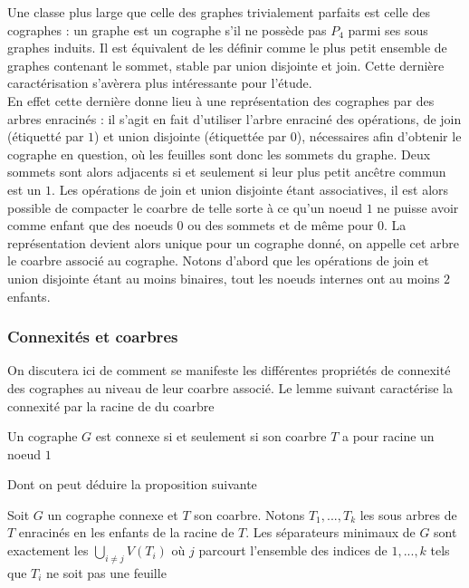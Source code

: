 \documentclass{scrartcl}
\begin{document}
\begin{flushleft}
Une classe plus large que celle des graphes trivialement parfaits est celle des cographes : un graphe est un cographe s'il ne possède pas
$P_4$ parmi ses sous graphes induits. Il est équivalent de les définir comme le plus petit ensemble de graphes contenant le sommet, stable par
union disjointe et join. Cette dernière caractérisation s'avèrera plus intéressante pour l'étude.\\
En effet cette dernière donne lieu à une représentation des cographes par des arbres enracinés : il s'agit en fait d'utiliser l'arbre
enraciné des opérations, de join (étiquetté par $1$) et union disjointe (étiquettée par $0$), nécessaires afin d'obtenir le cographe en question,
où les feuilles sont donc les sommets du graphe. Deux sommets sont alors adjacents si et seulement si leur plus petit ancêtre commun est un $1$.
Les opérations de join et union disjointe étant associatives, il est alors possible de compacter le coarbre de telle sorte à ce qu'un noeud
$1$ ne puisse avoir comme enfant que des noeuds $0$ ou des sommets et de même pour $0$. La représentation devient alors unique pour un cographe
donné, on appelle cet arbre le coarbre associé au cographe. Notons d'abord que les opérations de join et union disjointe étant au moins binaires,
tout les noeuds internes ont au moins $2$ enfants. 

\subsubsection{Connexités et coarbres}

On discutera ici de comment se manifeste les différentes propriétés de connexité des cographes au niveau de leur coarbre associé. Le lemme
suivant caractérise la connexité par la racine de du coarbre

\begin{lem}
    Un cographe $G$ est connexe si et seulement si son coarbre $T$ a pour racine un noeud $1$
\end{lem}

Dont on peut déduire la proposition suivante

\begin{prop}
    Soit $G$ un cographe connexe et $T$ son coarbre. Notons $T_1, ..., T_k$ les sous arbres de $T$ enracinés en les enfants de la racine de $T$.
    Les séparateurs minimaux de $G$ sont exactement les $\displaystyle \bigcup_{i \neq j} V(T_i)$ où $j$ parcourt l'ensemble des indices de $1, ..., k$
    tels que $T_i$ ne soit pas une feuille
\end{prop}


\end{flushleft}
\end{document}
